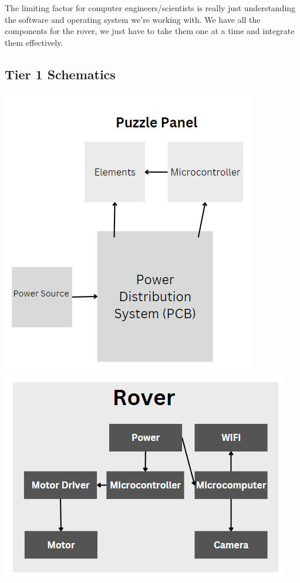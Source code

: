 \documentclass[a4paper, 10pt]{article}
\begin{document}
	The limiting factor for computer engineers/scientists is really just understanding the software and operating system we're working with. We have all the components for the rover, we just have to take them one at a time and integrate them effectively.

	\subsection{Tier 1 Schematics}

\includegraphics[scale=0.8]{Puzzle Panel tier 1 schematic}
\includegraphics[scale=0.8]{Rover tier 1 schematic}
\end{document}
